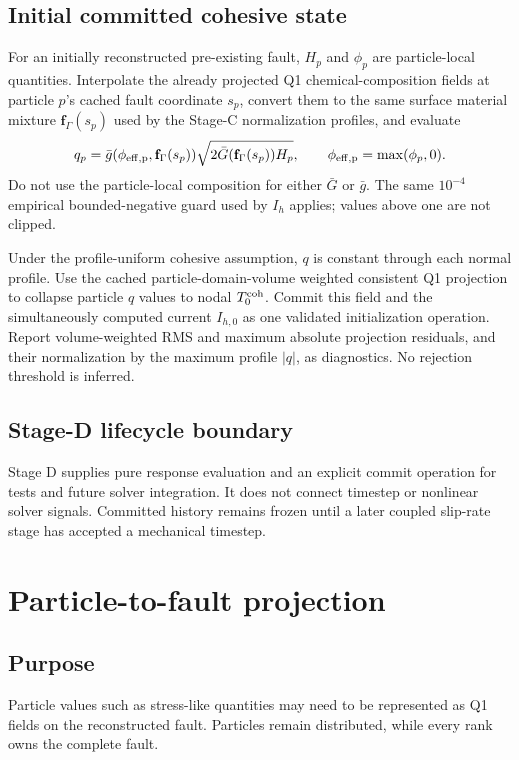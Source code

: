 \documentclass[11pt]{article}
\begin{document}
\subsection{Initial committed cohesive state}

For an initially reconstructed pre-existing fault, \(H_p\) and \(\phi_p\) are
particle-local quantities. Interpolate the
already projected Q1 chemical-composition fields at particle \(p\)'s cached
fault coordinate \(s_p\), convert them to the same surface material mixture
\(\mathbf f_\Gamma(s_p)\) used by the Stage-C normalization profiles, and
evaluate
\[
q_p=\bar g(\phi_{\rm eff,p},\mathbf f_\Gamma(s_p))
\sqrt{2\bar G(\mathbf f_\Gamma(s_p))H_p},
\qquad
\phi_{\rm eff,p}=\max(\phi_p,0).
\]
Do not use the particle-local composition for either \(\bar G\) or \(\bar g\).
The same \(10^{-4}\) empirical bounded-negative guard used by \(I_h\) applies;
values above one are not clipped.

Under the profile-uniform cohesive assumption, \(q\) is constant through each
normal profile. Use the cached particle-domain-volume weighted consistent Q1
projection to collapse particle \(q\) values to nodal \(T^{\rm coh}_0\).
Commit this field and the simultaneously computed current \(I_{h,0}\) as one
validated initialization operation. Report volume-weighted RMS and maximum
absolute projection residuals, and their normalization by the maximum
profile \(\lvert q\rvert\), as diagnostics. No rejection threshold is inferred.

\subsection{Stage-D lifecycle boundary}

Stage D supplies pure response evaluation and an explicit commit operation for
tests and future solver integration. It does not connect timestep or nonlinear
solver signals. Committed history remains frozen until a later coupled
slip-rate stage has accepted a mechanical timestep.

\section{Particle-to-fault projection}

\subsection{Purpose}
Particle values such as stress-like quantities may need to be represented as Q1 fields on the reconstructed fault.  Particles remain distributed, while every rank owns the complete fault.
\end{document}
